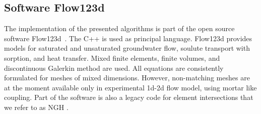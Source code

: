 \documentclass{elsarticle}
\newcommand{\noteJB}[1]{{\color{Blue} \textbf{JB: } \textit{#1}}}
\newcommand{\notePE}[1]{{\color{Orange} \textbf{PE: } \textit{#1}}}
\newcommand{\ngh}{NGH }
\begin{document}
\subsection{Software Flow123d}
The implementation of the presented algorithms is part of the open source software Flow123d~\cite{flow123d}.
The C++ is used as principal language. Flow123d provides models for saturated and unsaturated groundwater flow,
soulute transport with sorption, and  heat transfer. Mixed finite elements, finite volumes, and discontinuous Galerkin method are 
used. All equations are consistently formulated for meshes of mixed dimensions.  However,
non-matching meshes are at the moment available only in experimental 1d-2d flow model, using mortar like coupling.
Part of the software is also a legacy code for element intersections that we refer to as \ngh.


\end{document}
